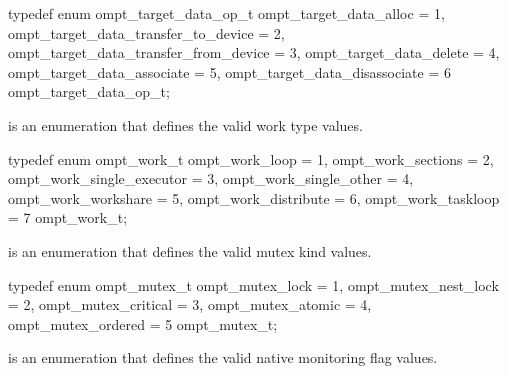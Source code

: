 \begin{ccppspecific}
\begin{omptEnum}
typedef enum ompt_target_data_op_t {
  ompt_target_data_alloc                = 1,
  ompt_target_data_transfer_to_device   = 2,
  ompt_target_data_transfer_from_device = 3,
  ompt_target_data_delete               = 4,
  ompt_target_data_associate            = 5,
  ompt_target_data_disassociate         = 6
} ompt_target_data_op_t;
\end{omptEnum}
\end{ccppspecific}





\label{sec:ompt_work_t}
 is an enumeration that defines the valid work type values.


\begin{ccppspecific}
\begin{omptEnum}
typedef enum ompt_work_t {
  ompt_work_loop               = 1,
  ompt_work_sections           = 2,
  ompt_work_single_executor    = 3,
  ompt_work_single_other       = 4,
  ompt_work_workshare          = 5,
  ompt_work_distribute         = 6,
  ompt_work_taskloop           = 7
} ompt_work_t;
\end{omptEnum}
\end{ccppspecific}





\label{sec:ompt_mutex_t}
 is an enumeration that defines the valid mutex kind values.


\begin{ccppspecific}
\begin{omptEnum}
typedef enum ompt_mutex_t {
  ompt_mutex_lock                     = 1,
  ompt_mutex_nest_lock                = 2,
  ompt_mutex_critical                 = 3,
  ompt_mutex_atomic                   = 4,
  ompt_mutex_ordered                  = 5
} ompt_mutex_t;
\end{omptEnum}
\end{ccppspecific}





\label{sec:ompt_native_mon_flag_t}
 is an enumeration that defines the valid native monitoring flag values.


